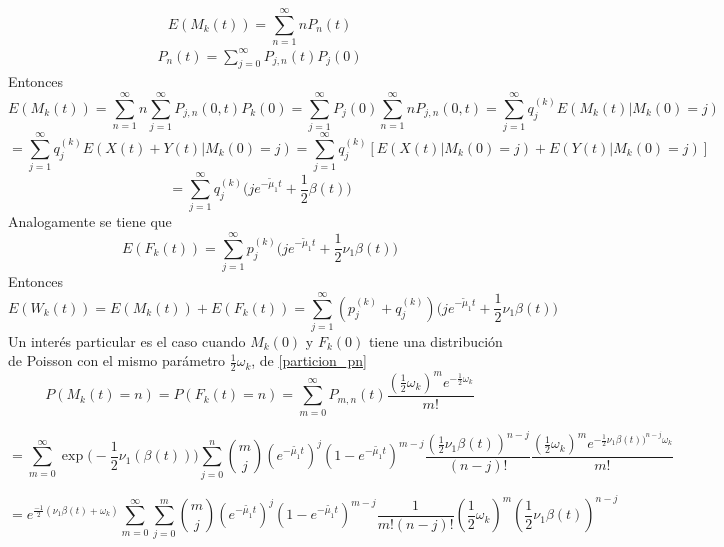 $$E(M_k(t))=\sum_{n=1}^\infty nP_n(t)$$
\begin{eqnarray}
    P_n(t)=\sum_{j=0}^\infty P_{j,n}(t)P_j(0)
    \label{particion_pn}
\end{eqnarray}
Entonces $$E(M_k(t))=\sum_{n=1}^\infty n \sum_{j=1}^\infty P_{j,n}(0,t)P_k(0)=\sum_{j=1}^\infty P_j(0)\sum_{n=1}^\infty n P_{j,n}(0,t)=\sum_{j=1}^\infty q^{(k)}_jE(M_k(t)|M_k(0)=j)$$ $$=\sum_{j=1}^\infty q^{(k)}_jE(X(t)+Y(t)|M_k(0)=j)=\sum_{j=1}^\infty q^{(k)}_j[E(X(t)|M_k(0)=j)+E(Y(t)|M_k(0)=j)]$$ $$=\sum_{j=1}^\infty q^{(k)}_j\big(je^{-\tilde{\mu}_1t}+\frac{1}{2}\beta(t)\big)$$Analogamente se tiene que $$E(F_k(t))=\sum_{j=1}^\infty p^{(k)}_j\big(je^{-\tilde{\mu}_1t}+\frac{1}{2}\nu_1\beta(t)\big)$$
Entonces $$E(W_k(t))=E(M_k(t))+E(F_k(t))=\sum_{j=1}^\infty( p^{(k)}_j+q^{(k)}_j)\big(je^{-\tilde{\mu}_1t}+\frac{1}{2}\nu_1\beta(t)\big)$$
Un interés particular es el caso cuando $M_k(0)$ y $F_k(0)$ tiene una distribución de Poisson con el mismo parámetro $\frac{1}{2}\omega_k$, de \ref{particion_pn}
$$P(M_k(t)=n)=P(F_k(t)=n)=\sum_{m=0}^\infty P_{m,n}(t) \frac{(\frac{1}{2}\omega_k)^m e^{-\frac{1}{2}\omega_k}}{m!}$$

$$=\sum_{m=0}^\infty\exp\bigg(-\frac{1}{2}\nu_1(\beta(t))\bigg)\sum_{j=0}^n{m \choose j}(e^{-\tilde{\mu_1}t})^j(1-e^{-\tilde{\mu_1}t})^{m-j}\frac{(\frac{1}{2}\nu_1\beta(t))^{n-j}}{(n-j)!}\frac{(\frac{1}{2}\omega_k)^m e^{-\frac{1}{2}\nu_1\beta(t))^{n-j}\omega_k}}{m!}$$ 

$$=e^{\frac{-1}{2}(\nu_1\beta(t)+\omega_k)}\sum_{m=0}^\infty\sum_{j=0}^m{m \choose j}(e^{-\tilde{\mu_1}t})^j(1-e^{-\tilde{\mu_1}t})^{m-j}\frac{1}{m!(n-j)!}(\frac{1}{2}\omega_k)^m(\frac{1}{2}\nu_1\beta(t))^{n-j}$$

